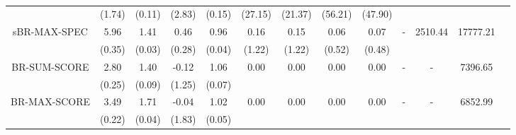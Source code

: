 \documentclass[12pt]{article}
\begin{document}
\begin{table}[!ht]
{\begin{tabular}{cccccccccc|ccc}
            & (1.74) & (0.11) & (2.83) & (0.15) & (27.15) & (21.37) & (56.21) & (47.90) & & & \\
            sBR-MAX-SPEC & 5.96 & 1.41 & 0.46 & 0.96 & 0.16 & 0.15 & 0.06 & 0.07 & - & 2510.44 & 17777.21  \\
            & (0.35) & (0.03) & (0.28) & (0.04) & (1.22) & (1.22) & (0.52) & (0.48) & & & \\
            BR-SUM-SCORE & 2.80 & 1.40 & -0.12 & 1.06 & 0.00 & 0.00 & 0.00 & 0.00 & - & - & 7396.65 \\ 
            & (0.25) & (0.09) & (1.25) & (0.07) &&&&&&&&  \\
            BR-MAX-SCORE & 3.49 & 1.71 & -0.04 & 1.02 & 0.00 & 0.00 & 0.00 & 0.00 & - & - & 6852.99 \\ 
            & (0.22) & (0.04) & (1.83) & (0.05) &&&&&&&&  \\
        \end{tabular}
    }
    \caption{}
    \label{tab:parameter_estimates}
\end{table}


\baselineskip=18pt


\end{document}
